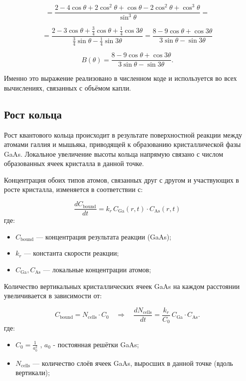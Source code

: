 \documentclass[14pt,oneside]{extarticle}
\begin{document}
\[
=\frac{2-4\cos\theta+2\cos^{2}\theta+\cos\theta-2\cos^{2}\theta+\cos^{3}\theta}{\sin^{3}\theta}=
\]

\[
=\frac{2-3\cos\theta+\frac{3}{4}\cos\theta+\frac{1}{4}\cos3\theta}{\frac{3}{4}\sin\theta-\frac{1}{4}\sin3\theta}=\frac{8-9\cos\theta+\cos3\theta}{3\sin\theta-\sin3\theta}
\]

\begin{equation}
B(\theta) = \frac{8-9\cos\theta+\cos3\theta}{3\sin\theta-\sin3\theta}
.
\label{eq:Btheta_final}
\end{equation}

Именно это выражение реализовано в численном коде и используется во всех вычислениях, связанных с объёмом капли.

\subsection{Рост кольца}

Рост квантового кольца происходит в результате поверхностной реакции между атомами галлия и мышьяка, приводящей к образованию кристаллической фазы GaAs. Локальное увеличение высоты кольца напрямую связано с числом образованных ячеек кристалла в данной точке.

Концентрация обоих типов атомов, связанных друг с другом и участвующих в росте кристалла, изменяется в соответствии с:

\[
\frac{dC_{\text{bound}}}{dt} = k_r \, C_{\text{Ga}}(r,t) \cdot C_{\text{As}}(r,t)
\]
где:
\begin{itemize}
  \item $C_{\text{bound}}$ — концентрация результата реакции (GaAs);
  \item $k_r$ — константа скорости реакции;
  \item $C_{\text{Ga}}, C_{\text{As}}$ — локальные концентрации атомов;
\end{itemize}

Количество вертикальных кристаллических ячеек GaAs на каждом расстоянии увеличивается в зависимости от:

\[
C_{\text{bound}} = N_{\text{cells}} \cdot C_0 \quad \Rightarrow \quad
\frac{dN_{\text{cells}}}{dt} = \frac{k_r}{C_0} \, C_{\text{Ga}} \cdot C_{\text{As}}.
\]
где:
\begin{itemize}
  \item $C_0 = \frac{1}{a_0^2}$ , $a_0$ - постоянная решётки GaAs;
  \item $N_{\text{cells}}$ — количество слоёв ячеек GaAs, выросших в данной точке (вдоль вертикали);
\end{itemize}
\end{document}
